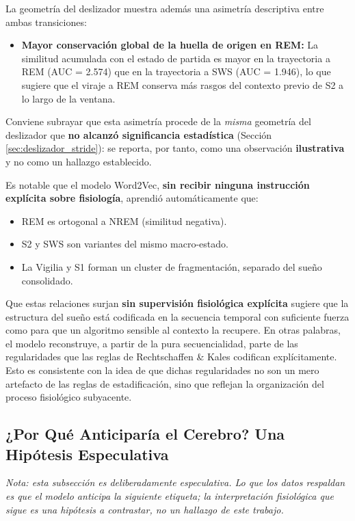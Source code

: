 La geometría del deslizador muestra además una asimetría descriptiva entre ambas transiciones:

\begin{itemize}
    \item \textbf{Mayor conservación global de la huella de origen en REM:} La similitud acumulada con el estado de partida es mayor en la trayectoria a REM (AUC = 2.574) que en la trayectoria a SWS (AUC = 1.946), lo que sugiere que el viraje a REM conserva más rasgos del contexto previo de S2 a lo largo de la ventana.
\end{itemize}

Conviene subrayar que esta asimetría procede de la \textit{misma} geometría del deslizador que \textbf{no alcanzó significancia estadística} (Sección \ref{sec:deslizador_stride}): se reporta, por tanto, como una observación \textbf{ilustrativa} y no como un hallazgo establecido.

Es notable que el modelo Word2Vec, \textbf{sin recibir ninguna instrucción explícita sobre fisiología}, aprendió automáticamente que:
\begin{itemize}
    \item REM es ortogonal a NREM (similitud negativa).
    \item S2 y SWS son variantes del mismo macro-estado.
    \item La Vigilia y S1 forman un cluster de fragmentación, separado del sueño consolidado.
\end{itemize}

Que estas relaciones surjan \textbf{sin supervisión fisiológica explícita} sugiere que la estructura del sueño está codificada en la secuencia temporal con suficiente fuerza como para que un algoritmo sensible al contexto la recupere. En otras palabras, el modelo reconstruye, a partir de la pura secuencialidad, parte de las regularidades que las reglas de Rechtschaffen \& Kales codifican explícitamente. Esto es consistente con la idea de que dichas regularidades no son un mero artefacto de las reglas de estadificación, sino que reflejan la organización del proceso fisiológico subyacente.

\subsection{¿Por Qué Anticiparía el Cerebro? Una Hipótesis Especulativa}

\textit{Nota: esta subsección es deliberadamente especulativa. Lo que los datos respaldan es que el modelo anticipa la siguiente etiqueta; la interpretación fisiológica que sigue es una hipótesis a contrastar, no un hallazgo de este trabajo.}

